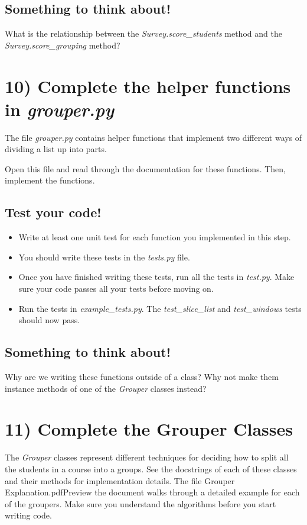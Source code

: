 \documentclass[12pt]{article}
\begin{document}
\bigskip

\subsection*{Something to think about!}
What is the relationship between the \textit{Survey.score\_students} method and
the\\ \textit{Survey.score\_grouping} method?

\section*{10) Complete the helper functions in \textit{grouper.py}}
The file \textit{grouper.py} contains helper functions that implement two different ways
of dividing a list up into parts.

\bigskip

\noindent Open this file and read through the documentation for these functions.
Then, implement the functions.

\bigskip

\subsection*{Test your code!}
\begin{itemize}
    \item Write at least one unit test for each function you implemented in this step.
    \item You should write these tests in the \textit{tests.py} file.
    \item Once you have finished writing these tests, run all the tests in \textit{test.py}.
    Make sure your code passes all your tests before moving on.
    \item Run the tests in \textit{example\_tests.py}. The \textit{test\_slice\_list} and
    \textit{test\_windows} tests should now pass.
\end{itemize}

\subsection*{Something to think about!}
Why are we writing these functions outside of a class? Why not make them instance
methods of one of the \textit{Grouper} classes instead?


\section*{11) Complete the Grouper Classes}
The \textit{Grouper} classes represent different techniques for deciding how to split all
the students in a course into a groups. See the docstrings of each of these classes
and their methods for implementation details. The file Grouper Explanation.pdfPreview
the document walks through a detailed example for each of the groupers. Make sure
you understand the algorithms before you start writing code.
\end{document}
